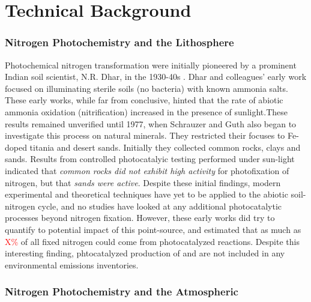 \section{Technical Background}
\vspace{1mm}
\vspace{1mm}
\subsubsection*{Nitrogen Photochemistry and the Lithosphere} 
\vspace{1mm}

Photochemical nitrogen transformation were initially pioneered by a prominent Indian soil scientist, N.R. Dhar, in the 1930-40s \cite{DHAR_1932}. Dhar and colleagues' early work focused on illuminating sterile soils (no bacteria) with known ammonia salts. These early works, while far from conclusive, hinted that the rate of abiotic ammonia oxidation (nitrification) increased in the presence of sunlight.These results remained unverified until 1977, when Schrauzer and Guth also began to investigate this process on natural minerals\cite{Schrauzer1977,schrauzer1979nitrogen}. They restricted their focuses to Fe-doped titania and desert sands. Initially they collected common rocks, clays and sands. Results from controlled photocatalyic testing performed under sun-light indicated that \emph{common rocks did not exhibit high activity} for photofixation of nitrogen, but that \emph{sands were active}. Despite these initial findings, modern experimental and theoretical techniques have yet to be applied to the abiotic soil-nitrogen cycle, and no studies have looked at any additional photocatalytic processes beyond nitrogen fixation. However, these early works did try to quantify to potential impact of this point-source, and estimated that as much as \textcolor{red}{X\%} of all fixed nitrogen could come from photocatalyzed reactions. Despite this interesting finding, phtocatalyzed production of \NH\hspace{1mm} and \NO\hspace{1mm} are not included in any environmental emissions inventories. 





\vspace{1mm}
\subsubsection*{Nitrogen Photochemistry and the Atmospheric}
\vspace{1mm}

